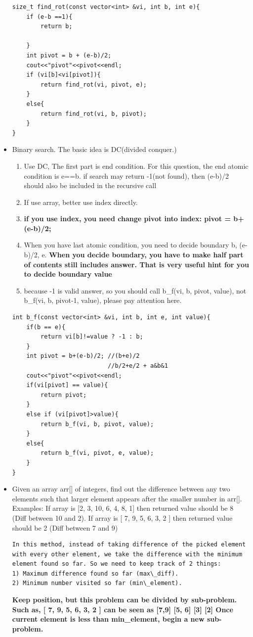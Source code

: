 \documentclass[a4paper,12pt,twoside]{book}
\begin{document}
\begin{itemize}
\begin{lstlisting}[breaklines]
size_t find_rot(const vector<int> &vi, int b, int e){
	if (e-b ==1){
		return b;
		
	}
	int pivot = b + (e-b)/2;
	cout<<"pivot"<<pivot<<endl;
	if (vi[b]<vi[pivot]){
		return find_rot(vi, pivot, e);
	}
	else{
		return find_rot(vi, b, pivot);
	}
}
\end{lstlisting}

\item Binary search. The basic idea is DC(divided conquer.) 
\begin{enumerate}
	\item Use DC, The first part is end condition. For this question, the end atomic condition is e==b. if search may return -1(not found), then (e-b)/2 should also be included in the recursive call
	\item If use array, better use index directly.
	\item \textbf{if you use index, you need change pivot into index: pivot = b+(e-b)/2;}
	\item When you have last atomic condition, you need to decide boundary  b, (e-b)/2, e. \textbf{When you decide boundary, you have to make half part of contents still includes answer. That is very useful hint for you to decide boundary value}
	\item because -1 is valid answer, so you should call 
	b\_f(vi, b, pivot, value), not b\_f(vi, b, pivot-1, value), please pay attention here. 
	

\end{enumerate}

\begin{lstlisting}[breaklines]
int b_f(const vector<int> &vi, int b, int e, int value){
	if(b == e){
		return vi[b]!=value ? -1 : b;
	}
	int pivot = b+(e-b)/2; //(b+e)/2 
						   //b/2+e/2 + a&b&1
	cout<<"pivot"<<pivot<<endl;
	if(vi[pivot] == value){
		return pivot;
	}
	else if (vi[pivot]>value){
		return b_f(vi, b, pivot, value);
	}
	else{
		return b_f(vi, pivot, e, value);
	}
}
\end{lstlisting}



\item Given an array arr[] of integers, find out the difference between any two elements such that larger element appears after the smaller number in arr[]. Examples: If array is [2, 3, 10, 6, 4, 8, 1] then returned value should be 8 (Diff between 10 and 2). If array is [ 7, 9, 5, 6, 3, 2 ] then returned value should be 2 (Diff between 7 and 9)
\begin{lstlisting}[breaklines]
In this method, instead of taking difference of the picked element with every other element, we take the difference with the minimum element found so far. So we need to keep track of 2 things:
1) Maximum difference found so far (max\_diff).
2) Minimum number visited so far (min\_element).
\end{lstlisting}
\textbf{Keep position, but this problem can be divided by sub-problem. Such as, [ 7, 9, 5, 6, 3, 2 ] can be seen as [7,9] [5, 6] [3] [2]  Once current element is less than min\_element, begin a new sub-problem.}


\end{itemize}
\end{document}
